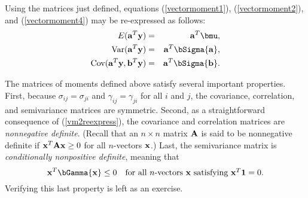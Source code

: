 Using the matrices just defined, equations (\ref{vectormoment1}), (\ref{vectormoment2}), and (\ref{vectormoment4}) may be re-expressed as follows:
\begin{eqnarray}
E({\bf a}^T{\bf y}) & = & {\bf a}^T\bmu, \label{vm1reexpress} \\
\mbox{Var}({\bf a}^T{\bf y}) & = & {\bf a}^T\bSigma{\bf a}, \label{vm2reexpress} \\
\mbox{Cov}({\bf a}^T{\bf y},{\bf b}^T{\bf y}) & = & {\bf a}^T\bSigma{\bf b}. \label{vm4reexpress}
\end{eqnarray}

The matrices of moments defined above satisfy several important properties.  First, because $\sigma_{ij}=\sigma_{ji}$ and $\gamma_{ij}=\gamma_{ji}$ for all $i$ and $j$, the covariance, correlation, and semivariance matrices are symmetric.  Second, as a straightforward consequence of (\ref{vm2reexpress}), the covariance and correlation matrices are {\em nonnegative definite}.  (Recall that an $n\times n$ matrix ${\bf A}$ is said to be nonnegative definite if ${\bf x}^T{\bf Ax}\geq 0$ for all $n$-vectors ${\bf x}$.)  Last, the semivariance matrix is {\em conditionally nonpositive definite}, meaning that
\begin{equation}\label{condnonposdef}
{\bf x}^T\bGamma{\bf x}\leq 0 \quad\mbox{for all $n$-vectors ${\bf x}$ satisfying ${\bf x}^T{\bf 1}=0$}.
\end{equation}
Verifying this last property is left as an exercise.


